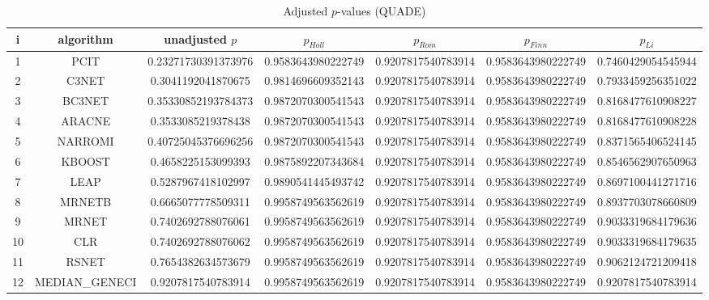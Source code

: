 \documentclass[a4paper,10pt]{article}
\begin{document}
\begin{landscape}
\begin{table}[!htp]
\centering\scriptsize
\caption{Adjusted $p$-values (QUADE)}
\begin{tabular}{ccccccc}
i&algorithm&unadjusted $p$&$p_{Holl}$&$p_{Rom}$&$p_{Finn}$&$p_{Li}$\\
\hline
1&PCIT&0.23271730391373976&0.9583643980222749&0.9207817540783914&0.9583643980222749&0.7460429054545944\\
2&C3NET&0.3041192041870675&0.9814696609352143&0.9207817540783914&0.9583643980222749&0.7933459256351022\\
3&BC3NET&0.35330852193784373&0.9872070300541543&0.9207817540783914&0.9583643980222749&0.8168477610908227\\
4&ARACNE&0.3533085219378438&0.9872070300541543&0.9207817540783914&0.9583643980222749&0.8168477610908228\\
5&NARROMI&0.40725045376696256&0.9872070300541543&0.9207817540783914&0.9583643980222749&0.8371565406524145\\
6&KBOOST&0.4658225153099393&0.9875892207343684&0.9207817540783914&0.9583643980222749&0.8546562907650963\\
7&LEAP&0.5287967418102997&0.9890541445493742&0.9207817540783914&0.9583643980222749&0.8697100441271716\\
8&MRNETB&0.6665077778509311&0.9958749563562619&0.9207817540783914&0.9583643980222749&0.8937703078660809\\
9&MRNET&0.7402692788076061&0.9958749563562619&0.9207817540783914&0.9583643980222749&0.9033319684179636\\
10&CLR&0.7402692788076062&0.9958749563562619&0.9207817540783914&0.9583643980222749&0.9033319684179635\\
11&RSNET&0.7654382634573679&0.9958749563562619&0.9207817540783914&0.9583643980222749&0.9062124721209418\\
12&MEDIAN_GENECI&0.9207817540783914&0.9958749563562619&0.9207817540783914&0.9583643980222749&0.9207817540783914\\
\hline
\end{tabular}
\end{table}

\end{landscape}
\end{document}
